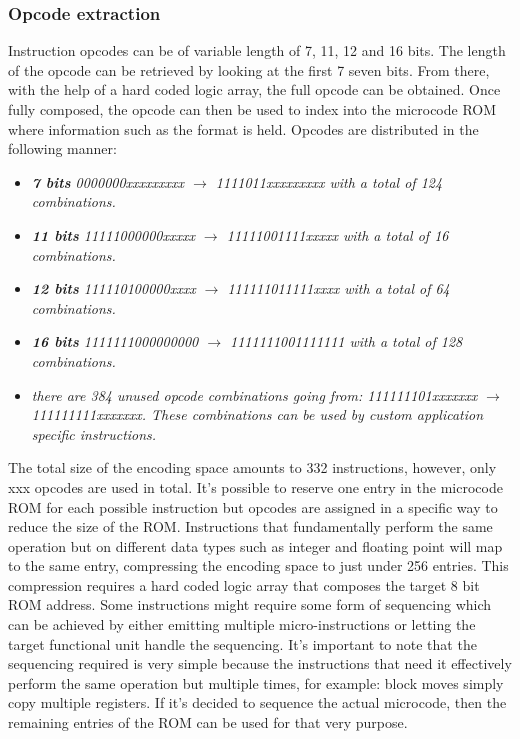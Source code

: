             \subsubsection{Opcode extraction}

                \vspace{10pt}

                Instruction opcodes can be of variable length of 7, 11, 12 and 16 bits. The length of the opcode can be retrieved by looking at the first 7 seven bits. From there, with the help of a hard coded logic array, the full opcode can be obtained. Once fully composed, the opcode can then be used to index into the microcode ROM where information such as the format is held. Opcodes are distributed in the following manner:

                \begin{itemize}

                    \item \textit{\textbf{7 bits} 0000000xxxxxxxxx $\rightarrow$ 1111011xxxxxxxxx with a total of 124 combinations.}
                    \item \textit{\textbf{11 bits} 11111000000xxxxx $\rightarrow$ 11111001111xxxxx with a total of 16 combinations.}
                    \item \textit{\textbf{12 bits} 111110100000xxxx $\rightarrow$ 111111011111xxxx with a total of 64 combinations.}
                    \item \textit{\textbf{16 bits} 1111111000000000 $\rightarrow$ 1111111001111111 with a total of 128 combinations.}

                    \item \textit{there are 384 unused opcode combinations going from: 111111101xxxxxxx $\rightarrow$ 111111111xxxxxxx. These combinations can be used by custom application specific instructions.}

                \end{itemize}

                The total size of the encoding space amounts to 332 instructions, however, only xxx opcodes are used in total. It's possible to reserve one entry in the microcode ROM for each possible instruction but opcodes are assigned in a specific way to reduce the size of the ROM. Instructions that fundamentally perform the same operation but on different data types such as integer and floating point will map to the same entry, compressing the encoding space to just under 256 entries. This compression requires a hard coded logic array that composes the target 8 bit ROM address. Some instructions might require some form of sequencing which can be achieved by either emitting multiple micro-instructions or letting the target functional unit handle the sequencing. It's important to note that the sequencing required is very simple because the instructions that need it effectively perform the same operation but multiple times, for example: block moves simply copy multiple registers. If it's decided to sequence the actual microcode, then the remaining entries of the ROM can be used for that very purpose.

